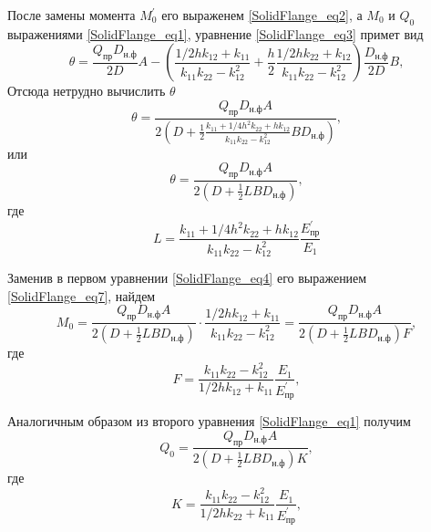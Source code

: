 После замены момента $M_0^{\prime}$ его выраженем \eqref{SolidFlange_eq2}, а $M_0$ и $Q_0$ выражениями \eqref{SolidFlange_eq1}, уравнение \eqref{SolidFlange_eq3} примет вид
\begin{equation}
  \label{SolidFlange_eq5}
    \theta =\frac{Q_{\text{пр}} D_{\text{н.ф}}}{2D}A - \left( \frac{1/2 h k_{12} +k_{11}}{k_{11}k_{22}-k_{12}^2} +\frac{h}{2} \frac{1/2 h k_{22} +k_{12}}{k_{11}k_{22}-k_{12}^2} \right) \frac{D_{\text{н.ф}}}{2D}B,
\end{equation}
Отсюда нетрудно вычислить $\theta$ 
\begin{equation}
  \label{SolidFlange_eq6}
   \theta =\frac{Q_{\text{пр}} D_{\text{н.ф}} A}{2 \left( D+ \displaystyle \frac{1}{2} \frac{k_{11} + 1/4 h^2 k_{22} + h k_{12}}{k_{11}k_{22} -k_{12}^2} B D_{\text{н.ф}} \right)},
\end{equation}
или 
\begin{equation}
  \label{SolidFlange_eq7}
   \theta =\frac{Q_{\text{пр}} D_{\text{н.ф}} A}{2 \left( D+ \displaystyle \frac{1}{2} L B D_{\text{н.ф}} \right)},
\end{equation}
где 
\begin{equation}
  \label{SolidFlange_eq8}
  L= \frac{k_{11} + 1/4 h^2 k_{22} + h k_{12}}{k_{11}k_{22} -k_{12}^2} \frac{E_{\text{пр}}^{\prime}}{E_1}
\end{equation}

Заменив {\theta} в первом уравнении \eqref{SolidFlange_eq4} его выражением \eqref{SolidFlange_eq7}, найдем 
\begin{equation}
  \label{SolidFlange_eq9}
  M_0=\frac{Q_{\text{пр}} D_{\text{н.ф}} A}{2 \left( D+ \displaystyle \frac{1}{2} L B D_{\text{н.ф}} \right)} \cdot \frac{1/2 h k_{12} +k_{11}}{k_{11}k_{22}-k_{12}^2} = \frac{Q_{\text{пр}} D_{\text{н.ф}} A}{2 \left( D+ \displaystyle \frac{1}{2} L B D_{\text{н.ф}} \right) F},
\end{equation}
где 
\begin{equation}
  \label{SolidFlange_eq10}
  F= \frac{k_{11}k_{22}-k_{12}^2}{1/2 h k_{12} +k_{11}} \frac{E_1}{E_{\text{пр}}^{\prime}},
\end{equation}

Аналогичным образом из второго уравнения \eqref{SolidFlange_eq1} получим
\begin{equation}
  \label{SolidFlange_eq11}
  Q_0 = \frac{Q_{\text{пр}} D_{\text{н.ф}} A}{2 \left( D+ \displaystyle \frac{1}{2} L B D_{\text{н.ф}} \right) K},
\end{equation}
где 
\begin{equation}
  \label{SolidFlange_eq12}
  K= \frac{k_{11}k_{22}-k_{12}^2}{1/2 h k_{22} +k_{11}} \frac{E_1}{E_{\text{пр}}^{\prime}},
\end{equation}

